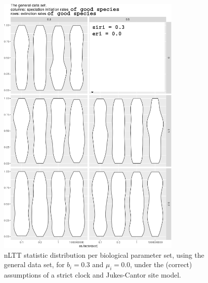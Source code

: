 \documentclass{article}
\begin{document}
\begin{figure}[!htbp]
  \includegraphics[width=0.8\textwidth]{fig_general_1.png}
  \caption{
    nLTT statistic distribution per biological parameter set, using the
    general data set, 
    for $b_i = 0.3$ and $\mu_i = 0.0$, 
    under the (correct) assumptions of a strict clock and Jukes-Cantor site model.
  }
\end{figure}
\end{document}
